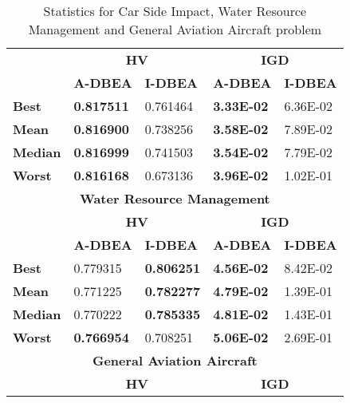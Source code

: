 \begin{table}[!htb]\scriptsize
	\centering
	\caption{Statistics for Car Side Impact, Water Resource Management and General Aviation Aircraft problem}
	\label{tab:hvcsiwrgaa}
	\begin{tabular}{|l|l|l|l|l|}
		\noalign{\smallskip}\hline
		\multicolumn{5}{|c|}{\textbf{Car Side Impact}}                                                 \\ \hline
		\textbf{}       & \multicolumn{2}{c|}{\textbf{HV}}      & \multicolumn{2}{c|}{\textbf{IGD}}    \\ \hline
		\textbf{}       & \textbf{A-DBEA}   & \textbf{I-DBEA}   & \textbf{A-DBEA}   & \textbf{I-DBEA}  \\ \hline
		\textbf{Best}   & \textbf{0.817511} & 0.761464          & \textbf{3.33E-02} & 6.36E-02         \\ \hline
		\textbf{Mean}   & \textbf{0.816900} & 0.738256          & \textbf{3.58E-02} & 7.89E-02         \\ \hline
		\textbf{Median} & \textbf{0.816999} & 0.741503          & \textbf{3.54E-02} & 7.79E-02         \\ \hline
		\textbf{Worst}  & \textbf{0.816168} & 0.673136          & \textbf{3.96E-02} & 1.02E-01         \\ \hline
		\multicolumn{5}{|c|}{\textbf{Water Resource Management}}                                                  \\ \hline
		\textbf{}       & \multicolumn{2}{c|}{\textbf{HV}}      & \multicolumn{2}{c|}{\textbf{IGD}}    \\ \hline
		\textbf{}       & \textbf{A-DBEA}   & \textbf{I-DBEA}   & \textbf{A-DBEA}   & \textbf{I-DBEA}  \\ \hline
		\textbf{Best}   & 0.779315          & \textbf{0.806251} & \textbf{4.56E-02} & 8.42E-02         \\ \hline
		\textbf{Mean}   & 0.771225          & \textbf{0.782277} & \textbf{4.79E-02} & 1.39E-01         \\ \hline
		\textbf{Median} & 0.770222          & \textbf{0.785335} & \textbf{4.81E-02} & 1.43E-01         \\ \hline
		\textbf{Worst}  & \textbf{0.766954} & 0.708251          & \textbf{5.06E-02} & 2.69E-01         \\ \hline
		\multicolumn{5}{|c|}{\textbf{General Aviation Aircraft}}                                       \\ \hline
		\textbf{}       & \multicolumn{2}{c|}{\textbf{HV}}      & \multicolumn{2}{c|}{\textbf{IGD}}    \\ \hline

\end{tabular}
\end{table}

